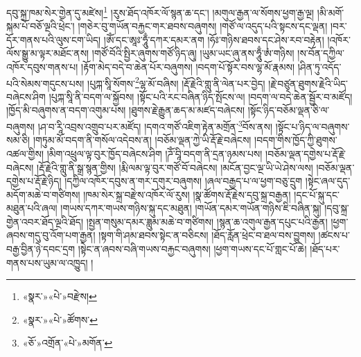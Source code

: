 དབུ་སྐྲ་ཁམ་སེར་གྱེན་དུ་མཛེས།\footnote{«སྣར་»«པེ་»བརྫེས།} །རུས་ཐོད་འཁོར་ལོ་སྙན་ཆ་དང་། །མགུལ་རྒྱན་ལ་སོགས་ཕྱག་རྒྱ་ལྔ། །མི་མགོ་སྐམ་པོ་བཅོ་ལྔའི་ཕྲེང་། །གཅེར་བུ་གཡོན་བརྐྱང་གར་ཐབས་བཞུགས། །གཙོ་ལ་འདུད་པའི་སྟངས་དང་ལྡན། །བར་དོར་གནས་པའི་ལུས་ངག་ཡིད། །ཨོཾ་དང་ཨཱཿ་ཧཱུྃ་དཀར་དམར་ནག །ཧོཿ་གཉིས་ཐབས་དང་ཤེས་རབ་བརྟེན། །འཁོར་ལོས་སྒྱུ་མ་ལྟར་མཐོང་ནས། །གཙོ་བོའི་སྤྱིར་ཞུགས་གཙོ་ཉིད་ཞུ། །ཡུམ་ཡང་ཞུ་ནས་ཧཱུྃ་ཨཾ་གཉིས། །ས་བོན་དཀྱིལ་འཁོར་དབུས་གནས་པ། །རྟོག་མེད་བདེ་བ་ཆེན་པོར་བཞུགས། །བདག་པོ་སྟོར་བས་ལྷ་མོ་རྣམས། །ཤིན་ཏུ་འདོད་པའི་སེམས་གདུངས་པས། །པུཀྐ་སཱི་སོགས་\footnote{«སྣར་»«པེ་»ཚོགས་}ལྷ་མོ་བཞིས། །རྡོ་རྗེའི་གླུ་ནི་ལེན་པར་བྱེད། །རྗེ་བཙུན་ཐུགས་རྗེའི་ཡིད་བཞེངས་ཤིག །པུཀྐ་སཱི་ནི་བདག་ལ་སྐྱོབས། །སྟོང་པའི་རང་བཞིན་ཉིད་སྤོངས་ལ། །བདག་ལ་བདེ་ཆེན་སྦྱོར་བ་མཛོད། །ཁྱོད་མི་བཞུགས་ན་བདག་འགུམ་པས། །ཐུགས་རྗེ་རྒྱུན་ཆད་མ་མཛད་བཞེངས། །སྟོང་ཉིད་བཅོམ་ལྡན་ཅི་ལ་བཞུགས། །ཤ་བ་རཱི་འབྲས་འགྲུབ་པར་མཛོད། །དགའ་གཙོ་འཇིག་རྟེན་མགྲོན་\footnote{«ཅོ་»འགྲོན་«པེ་»མགོན་}བོས་ནས། །སྟོང་པ་ཉིད་ལ་བཞུགས་སམ་ཅི། །གཏུམ་མོ་བདག་ནི་གསོལ་འདེབས་ན། །བཅོམ་ལྡན་ཀྱེ་ཡི་རྡོ་རྗེ་བཞེངས། །བདག་གིས་ཁྱོད་ཀྱི་ཐུགས་འཚལ་གྱིས། །མིག་འཕྲུལ་ལྟ་བུར་ཁྱོད་བཞེངས་ཤིག །ཌོཾ་བཱི་བདག་ནི་དྲན་ཉམས་པས། །བཅོམ་ལྡན་དགྱེས་པ་རྡོ་རྗེ་བཞེངས། །རྡོ་རྗེའི་གླུ་ནི་སྒྲ་སྙན་གྱིས། །རྨི་ལམ་ལྟ་བུར་གཙོ་བོ་བཞེངས། །མངོན་བྱང་ལྔ་ཡི་ཡེ་ཤེས་ལས། །བཅོམ་ལྡན་དགྱེས་པ་རྡོ་རྗེ་ཉིད། །དཀྱིལ་འཁོར་དབུས་ན་གར་དགུར་བཞུགས། །ཞལ་བརྒྱད་པ་ལ་ཕྱག་བཅུ་དྲུག །སྟེང་ཞལ་དུད་མདོག་མཆེ་བ་གཙིགས། །ཁམ་སེར་སྐྲ་བརྫེས་འཁོར་ལོ་རུས། །སྣ་ཚོགས་རྡོ་རྗེས་དབུ་སྐྲ་བརྒྱན། །དང་པོ་སྐུ་དང་མཐུན་པའི་ཞལ། །གཡས་དཀར་གཡས་གཉིས་སྐུ་དང་མཐུན། །གཡོན་དམར་གཡོན་གཉིས་ཇི་བཞིན་སྐུ། །དབུ་སྐྲ་གྱེན་འབར་ཐོད་ལྔའི་ཐོད། །སྤྱན་གསུམ་དམར་ཟླུམ་མཆེ་བ་གཙིགས། །སྙན་ཆ་འགུལ་རྒྱན་དཔུང་པའི་རྒྱན། །ཕྱག་ཞབས་གདུ་བུ་འོག་པག་རྒྱན། །སྟག་གི་ཤམ་ཐབས་སྟེང་ན་བཅིངས། །ཐོད་རློན་ཕྲེང་བ་ཐལ་བས་བྱུགས། །ཚངས་པ་བརྒྱ་བྱིན་ཉེ་དབང་དྲག །སྟེང་ན་ཞབས་བཞི་གཡས་བརྐྱང་བཞུགས། །ཕྱག་གཡས་དང་པོ་གླང་པོ་ཆེ། །ཐོད་པར་གནས་པས་ཡུམ་ལ་འཁྱུད། །
